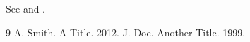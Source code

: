 \documentclass{acmcite}
\begin{document}
See  and \cite{a,b}.
\begin{thebibliography}{9}
 A. Smith. A Title. 2012.
 J. Doe. Another Title. 1999.
\end{thebibliography}
\end{document}
